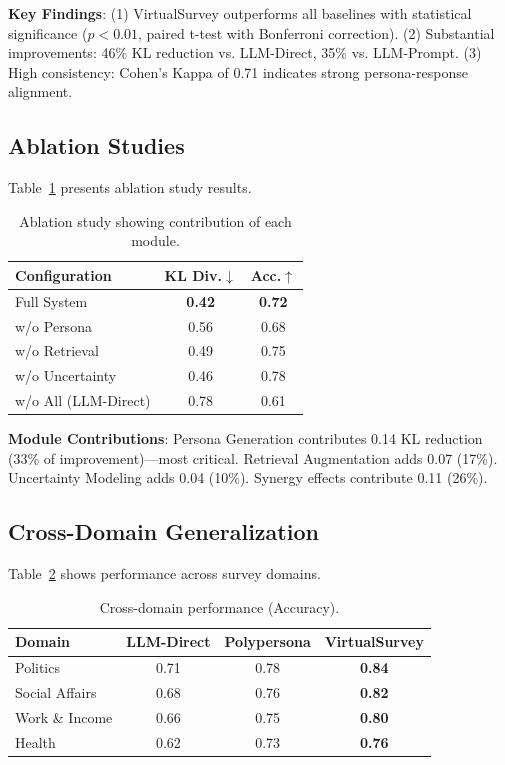 \documentclass[sigconf,nonarchival]{acmart}
\begin{document}
\textbf{Key Findings}:
(1) VirtualSurvey outperforms all baselines with statistical significance ($p < 0.01$, paired t-test with Bonferroni correction).
(2) Substantial improvements: 46\% KL reduction vs. LLM-Direct, 35\% vs. LLM-Prompt.
(3) High consistency: Cohen's Kappa of 0.71 indicates strong persona-response alignment.

\subsection{Ablation Studies}

Table~\ref{tab:ablation} presents ablation study results.

\begin{table}[t]
\centering
\caption{Ablation study showing contribution of each module.}
\label{tab:ablation}
\small
\begin{tabular}{l|cc}
\toprule
Configuration & KL Div.$\downarrow$ & Acc.$\uparrow$ \\
\midrule
Full System & \textbf{0.42} & \textbf{0.72} \\
w/o Persona & 0.56 & 0.68 \\
w/o Retrieval & 0.49 & 0.75 \\
w/o Uncertainty & 0.46 & 0.78 \\
w/o All (LLM-Direct) & 0.78 & 0.61 \\
\bottomrule
\end{tabular}
\end{table}

\textbf{Module Contributions}: Persona Generation contributes 0.14 KL reduction (33\% of improvement)—most critical. Retrieval Augmentation adds 0.07 (17\%). Uncertainty Modeling adds 0.04 (10\%). Synergy effects contribute 0.11 (26\%).

\subsection{Cross-Domain Generalization}

Table~\ref{tab:domain} shows performance across survey domains.

\begin{table}[t]
\centering
\caption{Cross-domain performance (Accuracy).}
\label{tab:domain}
\small
\begin{tabular}{l|ccc}
\toprule
Domain & LLM-Direct & Polypersona & VirtualSurvey \\
\midrule
Politics & 0.71 & 0.78 & \textbf{0.84} \\
Social Affairs & 0.68 & 0.76 & \textbf{0.82} \\
Work \& Income & 0.66 & 0.75 & \textbf{0.80} \\
Health & 0.62 & 0.73 & \textbf{0.76} \\
\bottomrule
\end{tabular}
\end{table}
\end{document}
